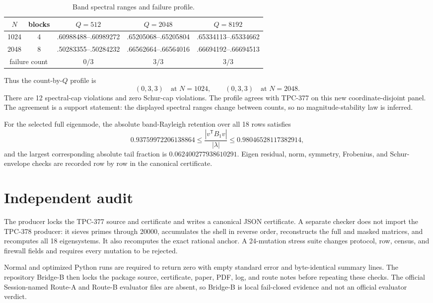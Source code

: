 \documentclass[10pt]{article}
\begin{document}
\begin{table}[ht]
\centering
\caption{Band spectral ranges and failure profile.}
\label{tab:profile}
\scriptsize
\begin{tabular}{c c c c c}
\toprule
$N$ & blocks & $Q=512$ & $Q=2048$ & $Q=8192$\\
\midrule
1024 & 4 & .60988488--.60989272 & .65205068--.65205804 &
.65334113--.65334662\\
2048 & 8 & .50283355--.50284232 & .66562664--.66564016 &
.66694192--.66694513\\
\midrule
\multicolumn{2}{c}{failure count} & $0/3$ & $3/3$ & $3/3$\\
\bottomrule
\end{tabular}
\end{table}

Thus the count-by-$Q$ profile is
\[
 (0,3,3)\quad\text{at }N=1024,\qquad
 (0,3,3)\quad\text{at }N=2048.
\]
There are 12 spectral-cap violations and zero Schur-cap violations.  The
profile agrees with TPC-377 on this new coordinate-disjoint panel.  The
agreement is a support statement: the displayed spectral ranges change
between counts, so no magnitude-stability law is inferred.

For the selected full eigenmode, the absolute band-Rayleigh retention over
all 18 rows satisfies
\[
 0.93759972206138864\le
 \frac{|v^\mathsf{T}B_1v|}{|\lambda|}
 \le0.98046528117382914,
\]
and the largest corresponding absolute tail fraction is
$0.062400277938610291$.  Eigen residual, norm, symmetry, Frobenius, and
Schur-envelope checks are recorded row by row in the canonical certificate.

\section{Independent audit}

The producer locks the TPC-377 source and certificate and writes a canonical
JSON certificate.  A separate checker does not import the TPC-378 producer:
it sieves primes through 20000, accumulates the shell in reverse order,
reconstructs the full and masked matrices, and recomputes all 18
eigensystems.  It also recomputes the exact rational anchor.  A 24-mutation
stress suite changes protocol, row, census, and firewall fields and requires
every mutation to be rejected.

Normal and optimized Python runs are required to return zero with empty
standard error and byte-identical summary lines.  The repository Bridge-B
then locks the package source, certificate, paper, PDF, log, and route notes
before repeating these checks.  The official Session-named Route-A and
Route-B evaluator files are absent, so Bridge-B is local fail-closed evidence
and not an official evaluator verdict.
\end{document}
